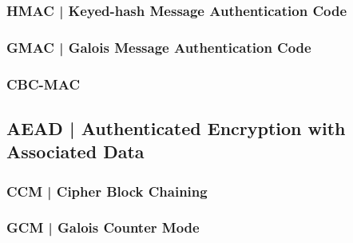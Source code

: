 
\textsf{\small }

\subsubsection{HMAC | Keyed-hash Message Authentication Code}


\textsf{\small }

\subsubsection{GMAC | Galois Message Authentication Code}


\textsf{\small }

\subsubsection{CBC-MAC}


\textsf{\small }


\subsection{AEAD | Authenticated Encryption with Associated Data}


\textsf{\small }

\subsubsection{CCM | Cipher Block Chaining}


\textsf{\small }

\subsubsection{GCM | Galois Counter Mode}


\textsf{\small }

